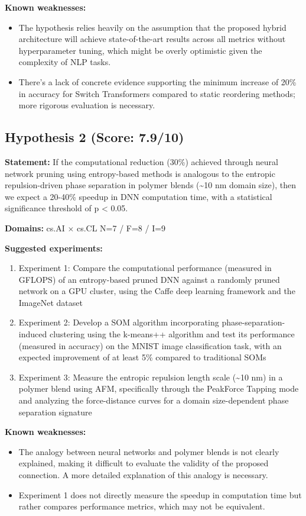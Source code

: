 \documentclass[12pt,a4paper]{article}
\begin{document}
\textbf{Known weaknesses:}
\begin{itemize}
  \item The hypothesis relies heavily on the assumption that the proposed hybrid architecture will achieve state-of-the-art results across all metrics without hyperparameter tuning, which might be overly optimistic given the complexity of NLP tasks.
  \item There's a lack of concrete evidence supporting the minimum increase of 20\% in accuracy for Switch Transformers compared to static reordering methods; more rigorous evaluation is necessary.
\end{itemize}
\subsection*{Hypothesis 2 (Score: 7.9/10)}

\textbf{Statement:} If the computational reduction (30\%) achieved through neural network pruning using entropy-based methods is analogous to the entropic repulsion-driven phase separation in polymer blends (\textasciitilde{}10 nm domain size), then we expect a 20-40\% speedup in DNN computation time, with a statistical significance threshold of p < 0.05.

\noindent\textbf{Domains:} cs.AI $\times$ cs.CL
\hspace{1em} N=7 / F=8 / I=9

\textbf{Suggested experiments:}
\begin{enumerate}
  \item Experiment 1: Compare the computational performance (measured in GFLOPS) of an entropy-based pruned DNN against a randomly pruned network on a GPU cluster, using the Caffe deep learning framework and the ImageNet dataset
  \item Experiment 2: Develop a SOM algorithm incorporating phase-separation-induced clustering using the k-means++ algorithm and test its performance (measured in accuracy) on the MNIST image classification task, with an expected improvement of at least 5\% compared to traditional SOMs
  \item Experiment 3: Measure the entropic repulsion length scale (\textasciitilde{}10 nm) in a polymer blend using AFM, specifically through the PeakForce Tapping mode and analyzing the force-distance curves for a domain size-dependent phase separation signature
\end{enumerate}

\textbf{Known weaknesses:}
\begin{itemize}
  \item The analogy between neural networks and polymer blends is not clearly explained, making it difficult to evaluate the validity of the proposed connection. A more detailed explanation of this analogy is necessary.
  \item Experiment 1 does not directly measure the speedup in computation time but rather compares performance metrics, which may not be equivalent.
\end{itemize}
\end{document}

